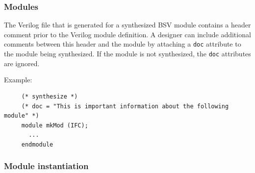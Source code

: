 \documentclass[twoside,letterpaper]{article}
\newcommand{\te}[1]{\texttt{#1}}
\begin{document}

\subsubsection{Modules}
\label{doc-modules}


The Verilog file that is generated for a synthesized BSV module
contains a header comment prior to the Verilog module definition.  A
designer can include additional comments between this header and the
module by attaching a \te{doc} attribute to the module being synthesized.
  If the module  is not synthesized,  the \te{doc} attributes are ignored. 

Example:
\begin{verbatim}
     (* synthesize *)
     (* doc = "This is important information about the following module" *)
     module mkMod (IFC);
       ...
     endmodule
\end{verbatim}


\subsubsection{Module instantiation}
\label{comments-module instantiation}
\end{document}
